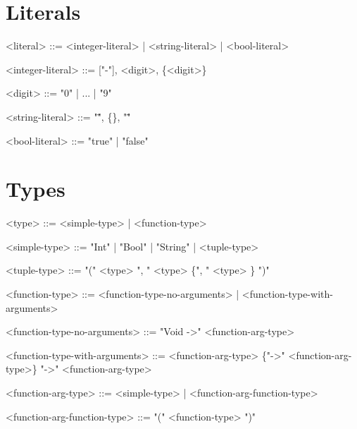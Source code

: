 \documentclass{article}
\author{Michał Majewski}
\begin{document}
\section{Literals}
\begin{grammar}
<literal> ::= <integer-literal> | <string-literal> | <bool-literal>

<integer-literal> ::= ["-"], <digit>, \{<digit>\}

<digit> ::= "0" | ... | "9"

<string-literal> ::= "\"", \{<ASCII-character>\}, "\""

<bool-literal> ::= "true" | "false"

\end{grammar}

\section{Types}
\begin{grammar}
<type> ::= <simple-type> | <function-type>

<simple-type> ::= "Int" | "Bool" | "String" | <tuple-type>

<tuple-type> ::= "(" <type> ", " <type> \{", " <type> \} ")"

<function-type> ::= <function-type-no-arguments> | <function-type-with-arguments>

<function-type-no-arguments> ::= "Void ->" <function-arg-type>

<function-type-with-arguments> ::= <function-arg-type> \{"->" <function-arg-type>\} "->" <function-arg-type>

<function-arg-type> ::= <simple-type> | <function-arg-function-type>

<function-arg-function-type> ::= "(" <function-type> ")"

\end{grammar}
\end{document}
